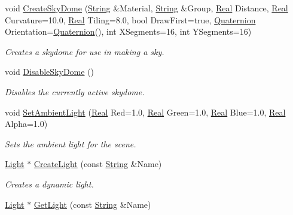 \begin{DoxyCompactItemize}
void \hyperlink{classphys_1_1SceneManager_abdcafee65bedf3c268759553b91a7c6b}{CreateSkyDome} (\hyperlink{namespacephys_aa03900411993de7fbfec4789bc1d392e}{String} \&Material, \hyperlink{namespacephys_aa03900411993de7fbfec4789bc1d392e}{String} \&Group, \hyperlink{namespacephys_af7eb897198d265b8e868f45240230d5f}{Real} Distance, \hyperlink{namespacephys_af7eb897198d265b8e868f45240230d5f}{Real} Curvature=10.0, \hyperlink{namespacephys_af7eb897198d265b8e868f45240230d5f}{Real} Tiling=8.0, bool DrawFirst=true, \hyperlink{classphys_1_1Quaternion}{Quaternion} Orientation=\hyperlink{classphys_1_1Quaternion}{Quaternion}(), int XSegments=16, int YSegments=16)
\begin{DoxyCompactList}\small\item\em Creates a skydome for use in making a sky. \item\end{DoxyCompactList}\item 
void \hyperlink{classphys_1_1SceneManager_a11bf15ca8c7d758ee50e423ad03d2625}{DisableSkyDome} ()
\begin{DoxyCompactList}\small\item\em Disables the currently active skydome. \item\end{DoxyCompactList}\item 
void \hyperlink{classphys_1_1SceneManager_a686b7199aff8db87af84f40ec933809a}{SetAmbientLight} (\hyperlink{namespacephys_af7eb897198d265b8e868f45240230d5f}{Real} Red=1.0, \hyperlink{namespacephys_af7eb897198d265b8e868f45240230d5f}{Real} Green=1.0, \hyperlink{namespacephys_af7eb897198d265b8e868f45240230d5f}{Real} Blue=1.0, \hyperlink{namespacephys_af7eb897198d265b8e868f45240230d5f}{Real} Alpha=1.0)
\begin{DoxyCompactList}\small\item\em Sets the ambient light for the scene. \item\end{DoxyCompactList}\item 
\hyperlink{classphys_1_1Light}{Light} $\ast$ \hyperlink{classphys_1_1SceneManager_aaf14df62a5d6c55c3307d154a0caf5ea}{CreateLight} (const \hyperlink{namespacephys_aa03900411993de7fbfec4789bc1d392e}{String} \&Name)
\begin{DoxyCompactList}\small\item\em Creates a dynamic light. \item\end{DoxyCompactList}\item 
\hyperlink{classphys_1_1Light}{Light} $\ast$ \hyperlink{classphys_1_1SceneManager_a9cad3a29d1d3664ab42e99141142eb59}{GetLight} (const \hyperlink{namespacephys_aa03900411993de7fbfec4789bc1d392e}{String} \&Name)

\end{DoxyCompactItemize}
